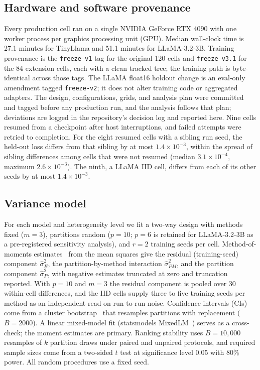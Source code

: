\subsection{Hardware and software provenance}
Every production cell ran on a single NVIDIA GeForce RTX 4090 with one worker process per graphics processing unit (GPU). Median wall-clock time is 27.1 minutes for TinyLlama and 51.1 minutes for LLaMA-3.2-3B. Training provenance is the \texttt{freeze-v1} tag for the original 120 cells and
\texttt{freeze-v3.1} for the 84 extension cells, each with a clean tracked tree; the
training path is byte-identical across those tags. The LLaMA float16 holdout change is an eval-only amendment tagged \texttt{freeze-v2}; it does not alter training code or aggregated adapters. The design, configurations, grids, and analysis plan were committed and tagged before any production run, and the analysis follows that plan; deviations are logged in the repository's decision log and reported here. Nine cells resumed from a checkpoint after host interruptions, and failed attempts
were retried to completion. For the eight resumed cells with a sibling run seed, the
held-out loss differs from that sibling by at most $1.4{\times}10^{-3}$, within the spread of sibling
differences among cells that were not resumed (median $3.1{\times}10^{-4}$, maximum $2.6{\times}10^{-3}$). The ninth,
a LLaMA IID cell, differs from each of its other seeds by at most $1.4{\times}10^{-3}$.

\subsection{Variance model}
For each model and heterogeneity level we fit a two-way design with methods fixed ($m{=}3$),
partitions random ($p{=}10$; $p{=}6$ is retained for LLaMA-3.2-3B as a pre-registered
sensitivity analysis), and $r{=}2$ training seeds per cell.
Method-of-moments estimates~\cite{searle1992variance} from the mean squares give the residual (training-seed) component $\hat\sigma^2_E$, the partition-by-method interaction $\hat\sigma^2_{PM}$, and the partition component $\hat\sigma^2_P$, with negative estimates truncated at zero and truncation reported.
With $p{=}10$ and $m{=}3$ the residual component is pooled over $30$ within-cell
differences, and the IID cells supply three to five training seeds per method as an
independent read on run-to-run noise.
Confidence intervals (CIs) come from a cluster bootstrap~\cite{field2007bootstrapping} that resamples partitions with replacement ($B{=}2000$). A linear mixed-model fit (statsmodels MixedLM~\cite{seabold2010statsmodels}) serves as a cross-check; the moment estimates are primary. Ranking stability uses $B{=}10{,}000$ resamples of $k$ partition draws under paired and unpaired protocols, and required sample sizes come from a two-sided $t$ test at significance level $0.05$ with 80\% power. All random procedures use a fixed seed.
